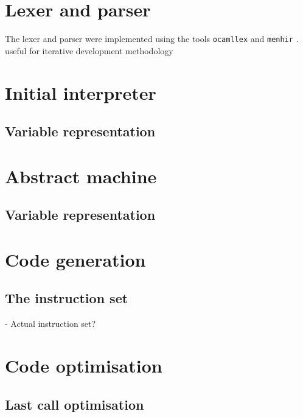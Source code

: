 \documentclass[12pt,a4paper]{report}
\begin{document}
\section{Lexer and parser}

The lexer and parser were implemented using the tools  \texttt{ocamllex}  \cite{ocamlyacc} and \texttt{menhir} \cite{ocamlBook}. {\color{red} useful for iterative development methodology}




\section{Initial interpreter}

\subsection{Variable representation}

\section{Abstract machine}

\subsection{Variable representation}

\section{Code generation}

\subsection{The instruction set}

- Actual instruction set?

\section{Code optimisation}

\subsection{Last call optimisation}
\end{document}
